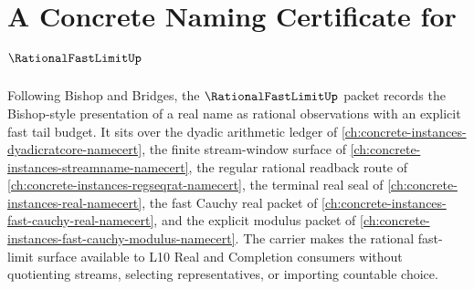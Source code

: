 \chapter{A Concrete Naming Certificate for $\RationalFastLimitUp$}
\label{ch:concrete-instances-rational-fast-limit-namecert}

Following Bishop and Bridges, the $\RationalFastLimitUp$ packet records the Bishop-style presentation of a real name as rational observations with an explicit fast tail budget. It sits over the dyadic arithmetic ledger of \autoref{ch:concrete-instances-dyadicratcore-namecert}, the finite stream-window surface of \autoref{ch:concrete-instances-streamname-namecert}, the regular rational readback route of \autoref{ch:concrete-instances-regseqrat-namecert}, the terminal real seal of \autoref{ch:concrete-instances-real-namecert}, the fast Cauchy real packet of \autoref{ch:concrete-instances-fast-cauchy-real-namecert}, and the explicit modulus packet of \autoref{ch:concrete-instances-fast-cauchy-modulus-namecert}. The carrier makes the rational fast-limit surface available to L10 Real and Completion consumers without quotienting streams, selecting representatives, or importing countable choice.

